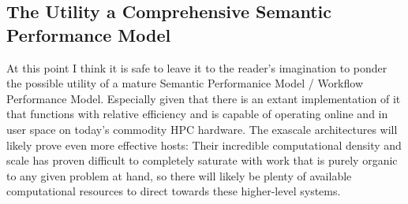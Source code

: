 
\subsection{The Utility a Comprehensive Semantic Performance Model}

At this point I think it is safe to leave it to the reader's
imagination to ponder the possible utility of a mature Semantic
Performanice Model / Workflow Performance Model. Especially given that
there is an extant implementation of it that functions with relative
efficiency and is capable of operating online and in user space on
today's commodity HPC hardware. The exascale architectures will likely
prove even more effective hosts: Their incredible computational
density and scale has proven difficult to completely saturate with
work that is purely organic to any given problem at hand, so there
will likely be plenty of available computational resources to direct
towards these higher-level systems.

